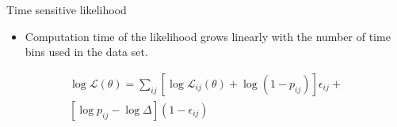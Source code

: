 \documentclass[aspectratio=169]{beamer}
\begin{document}
  \begin{frame}{Time sensitive likelihood}
      \begin{itemize}
      \item Computation time of the likelihood grows linearly with the number of time bins used in the data set.
      \end{itemize}
      \begin{multline}\label{eq:time_sep_flagged}
      \log \mathcal{L} \left(\theta\right) = \sum_{ij} \left[\log \mathcal{L}_{ij} \left(\theta\right) + \log\left(1-p_{ij}\right)\right]\epsilon_{ij} +
      \\
      \left[ \log p_{ij} - \log \Delta \right]\left(1-\epsilon_{ij}\right)
      \end{multline}
    \end{frame}
\end{document}
